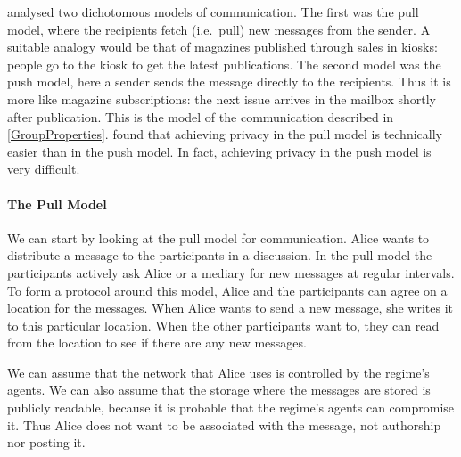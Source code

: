 \citet{PPACforPubFS} analysed two dichotomous models of communication.
The first was the pull model, where the recipients fetch (i.e.\ pull) new 
messages from the sender.
A suitable analogy would be that of magazines published through sales in 
kiosks: people go to the kiosk to get the latest publications.
The second model was the push model, here a sender sends the message directly 
to the recipients.
Thus it is more like magazine subscriptions: the next issue arrives in the 
mailbox shortly after publication.
This is the model of the communication described in \cref{GroupProperties}.
\citeauthor{PPACforPubFS} found that achieving privacy in the pull model is 
technically easier than in the push model.
In fact, achieving privacy in the push model is very difficult.

\paragraph{The Pull Model}
We can start by looking at the pull model for communication.
Alice wants to distribute a message to the participants in a discussion.
In the pull model the participants actively ask Alice or a mediary for new 
messages at regular intervals.
To form a protocol around this model, Alice and the participants can agree on 
a location for the messages.
When Alice wants to send a new message, she writes it to this particular 
location.
When the other participants want to, they can read from the location to see if 
there are any new messages.

We can assume that the network that Alice uses is controlled by the regime's 
agents.
We can also assume that the storage where the messages are stored is publicly 
readable, because it is probable that the regime's agents can compromise it.
Thus Alice does not want to be associated with the message, not authorship nor 
posting it.

